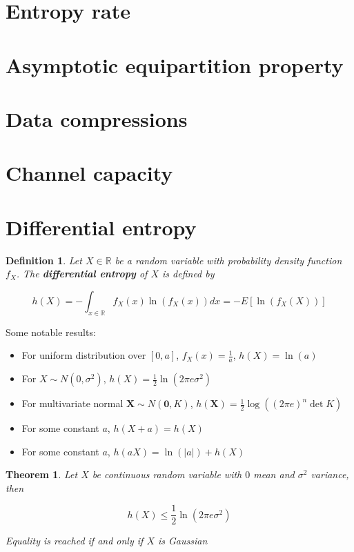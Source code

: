 \documentclass{article}
\newcommand{\norm}[1]{\vert {#1} \vert}
\newtheorem{definition}{Definition}[section]
\newtheorem{theorem}{Theorem}[section]
\begin{document}
\section{Entropy rate}

\section{Asymptotic equipartition property}

\section{Data compressions}

\section{Channel capacity}

\section{Differential entropy}
\begin{definition}
    Let $X \in \mathbb{R}$ be a random variable with probability density function $f_X$. The \textbf{differential entropy} of $X$ is defined by

    \begin{equation*}
        h(X) = -\int_{x \in \mathbb{R}} f_X(x)\ln(f_X(x))dx = -E[\ln(f_X(X))]
    \end{equation*}
\end{definition}

Some notable results:

\begin{itemize}
    \item For uniform distribution over $[0, a]$, $f_X(x) = \frac{1}{a}$, $h(X) = \ln(a)$
    \item For $X \sim N(0, \sigma^2)$, $h(X) = \frac{1}{2}\ln(2\pi e \sigma^2)$
    \item For multivariate normal $\mathbf{X} \sim N(\mathbf{0}, K)$, $h(\mathbf{X}) = \frac{1}{2}\log ((2\pi e)^n \det{K})$
    \item For some constant $a$, $h(X + a) = h(X)$
    \item For some constant $a$, $h(aX) = \ln(\norm{a}) + h(X)$
\end{itemize}

\begin{theorem}
    Let $X$ be continuous random variable with $0$ mean and $\sigma^2$ variance, then

    \begin{equation*}
        h(X) \leq \frac{1}{2}\ln(2\pi e \sigma^2)
    \end{equation*}

    Equality is reached if and only if $X$ is Gaussian
\end{theorem}
\end{document}

